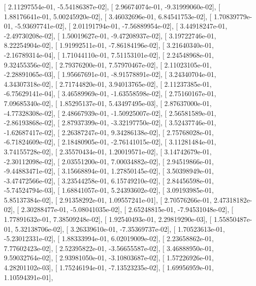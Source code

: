 \documentclass{article}
\begin{document}
       [  2.11297554e-01,  -5.54186387e-02],
       [  2.96674074e-01,  -9.31999060e-02],
       [  1.88176641e-01,   5.00245920e-02],
       [  3.46032696e-01,   6.84541753e-02],
       [  1.70839779e-01,  -5.93697741e-02],
       [  2.01191794e-01,  -7.56889954e-02],
       [  3.44918247e-01,  -2.49730208e-02],
       [  1.50019627e-01,  -9.47208937e-02],
       [  3.19722746e-01,   8.22254904e-02],
       [  1.91992511e-01,  -7.86184196e-02],
       [  3.21640340e-01,  -2.16789314e-04],
       [  1.71044110e-01,   7.51153101e-02],
       [  2.24548968e-01,   9.32455356e-02],
       [  2.79376200e-01,   7.57970467e-02],
       [  2.11023105e-01,  -2.28891065e-03],
       [  1.95667691e-01,  -8.91578891e-02],
       [  3.24340704e-01,   4.34307318e-02],
       [  2.71744820e-01,   3.94013765e-02],
       [  2.11237385e-01,  -6.75629141e-04],
       [  3.46589969e-01,  -1.63558598e-02],
       [  2.75160167e-01,   7.09685340e-02],
       [  1.85295137e-01,   5.43497495e-03],
       [  2.87637000e-01,  -4.77328308e-02],
       [  2.48667939e-01,  -1.50925007e-02],
       [  2.56581589e-01,  -2.86193868e-02],
       [  2.87937399e-01,  -3.32197750e-02],
       [  3.52437746e-01,  -1.62687417e-02],
       [  2.26387247e-01,   9.34286138e-02],
       [  2.75768028e-01,  -6.71824609e-02],
       [  2.18480905e-01,  -2.76141015e-02],
       [  3.11281484e-01,   3.74155728e-02],
       [  2.35570434e-01,   1.20019571e-02],
       [  3.14742679e-01,  -2.30112098e-02],
       [  2.03551200e-01,   7.00034882e-02],
       [  2.94519866e-01,  -9.44883471e-02],
       [  3.15668894e-01,   1.27850145e-02],
       [  3.50398949e-01,  -3.47472566e-02],
       [  3.23544258e-01,   6.15749210e-02],
       [  2.84456598e-01,  -5.74524794e-03],
       [  1.68841057e-01,   5.24393602e-02],
       [  3.09193985e-01,   5.85137384e-02],
       [  2.91358292e-01,   1.09557241e-01],
       [  2.70576266e-01,   2.47318182e-02],
       [  2.30288477e-01,  -5.08041035e-02],
       [  2.65248815e-01,  -7.94531048e-02],
       [  1.77891632e-01,   7.38509248e-02],
       [  1.92540493e-01,   2.29819290e-03],
       [  1.55850487e-01,   5.32138706e-02],
       [  3.26339610e-01,  -7.35369737e-02],
       [  1.70523613e-01,  -5.23012331e-02],
       [  1.88333994e-01,   6.02019009e-02],
       [  2.23658862e-01,   7.77602423e-02],
       [  2.52395822e-01,  -3.56655587e-02],
       [  3.46888950e-01,   9.59032764e-02],
       [  2.93981050e-01,  -3.10803687e-02],
       [  1.57226926e-01,   4.28201102e-03],
       [  1.75246194e-01,  -7.13523235e-02],
       [  1.69956959e-01,   1.10594391e-01],
\end{document}
